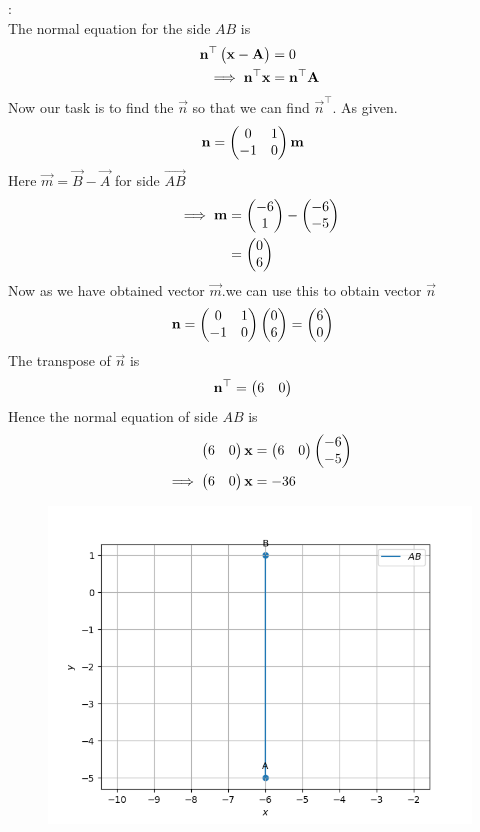 \documentclass[11pt]{book}
\begin{document}
\begin{enumerate}[label=\thesection.\arabic*.,ref=\thesection.\theenumi]
\solution:\\
       The normal equation for the side $AB$ is
\begin{align}
\mathbf{n}^{\top}\begin{pmatrix}\mathbf{x}-\mathbf{A}\end{pmatrix}&=0\\
\implies
\mathbf{n}^{\top}\mathbf{x}&=\mathbf{n}^{\top}\mathbf{A}
\end{align}
Now our task is to find the $\vec{n}$ so that we can find $\vec{n}^{\top}$.
As given. 
\begin{align}
  \mathbf{n} &= \begin{pmatrix}0 & 1\\
  -1 & 0\end{pmatrix}\mathbf{m}
\end{align}
Here $\vec{m} = \vec{B}- \vec{A}$ for side $\vec{AB}$
\begin{align}
\implies
\mathbf{m}&=\begin{pmatrix}-6\\1\end{pmatrix} - \begin{pmatrix}-6\\-5\end{pmatrix}\\
&=\begin{pmatrix}0\\6\end{pmatrix}
\end{align}
Now as we have obtained vector $\vec{m}$.we can use this to obtain vector $\vec{n}$
\begin{align}
\mathbf{n}  &= \begin{pmatrix}0 & 1\\
  -1 & 0\end{pmatrix}\begin{pmatrix}0\\6\end{pmatrix}
  = \begin{pmatrix}6\\0\end{pmatrix}
\end{align}
The transpose of $\vec{n}$ is
\begin{align}
  \mathbf{n}^{\top}&=\begin{pmatrix}6 & 0\end{pmatrix}
\end{align}
Hence the normal equation of side $AB$ is 
\begin{align}
    \begin{pmatrix}6 & 0\end{pmatrix}\mathbf{x}&=\begin{pmatrix}6 & 0\end{pmatrix}\begin{pmatrix}-6\\-5\end{pmatrix}\\
    \implies \begin{pmatrix}6 & 0\end{pmatrix}\mathbf{x} &= -36
\end{align}
\begin{figure}[H]
\includegraphics [width=\columnwidth] {figs/AB.png}

\end{figure}
\end{enumerate}
\end{document}
